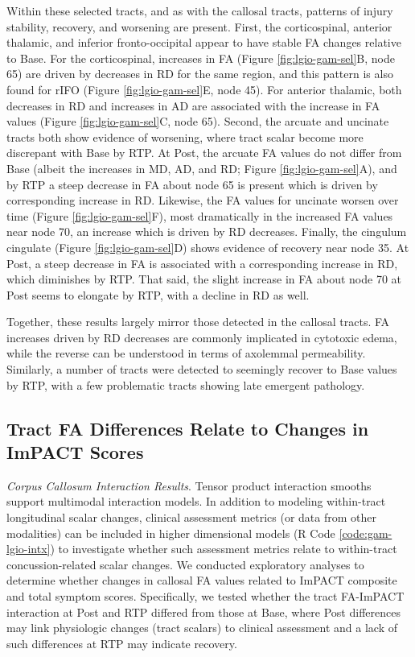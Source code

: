 \documentclass[12pt]{article}
\begin{document}
Within these selected tracts, and as with the callosal tracts, patterns of injury stability, recovery, and worsening are present. First, the corticospinal, anterior thalamic, and inferior fronto-occipital appear to have stable FA changes relative to Base. For the corticospinal, increases in FA (Figure \ref{fig:lgio-gam-sel}B, node 65) are driven by decreases in RD for the same region, and this pattern is also found for rIFO (Figure \ref{fig:lgio-gam-sel}E, node 45). For anterior thalamic, both decreases in RD and increases in AD are associated with the increase in FA values (Figure \ref{fig:lgio-gam-sel}C, node 65). Second, the arcuate and uncinate tracts both show evidence of worsening, where tract scalar become more discrepant with Base by RTP. At Post, the arcuate FA values do not differ from Base (albeit the increases in MD, AD, and RD; Figure \ref{fig:lgio-gam-sel}A), and by RTP a steep decrease in FA about node 65 is present which is driven by corresponding increase in RD. Likewise, the FA values for uncinate worsen over time (Figure \ref{fig:lgio-gam-sel}F), most dramatically in the increased FA values near node 70, an increase which is driven by RD decreases. Finally, the cingulum cingulate (Figure \ref{fig:lgio-gam-sel}D) shows evidence of recovery near node 35. At Post, a steep decrease in FA is associated with a corresponding increase in RD, which diminishes by RTP. That said, the slight increase in FA about node 70 at Post seems to elongate by RTP, with a decline in RD as well.

Together, these results largely mirror those detected in the callosal tracts. FA increases driven by RD decreases are commonly implicated in cytotoxic edema, while the reverse can be understood in terms of axolemmal permeability. Similarly, a number of tracts were detected to seemingly recover to Base values by RTP, with a few problematic tracts showing late emergent pathology.


\subsection{Tract FA Differences Relate to Changes in ImPACT Scores}
\label{ssec:res-dwi-imp}
\textit{Corpus Callosum Interaction Results}. Tensor product interaction smooths support multimodal interaction models. In addition to modeling within-tract longitudinal scalar changes, clinical assessment metrics (or data from other modalities) can be included in higher dimensional models (R Code \ref{code:gam-lgio-intx}) to investigate whether such assessment metrics relate to within-tract concussion-related scalar changes. We conducted exploratory analyses to determine whether changes in callosal FA values related to ImPACT composite and total symptom scores. Specifically, we tested whether the tract FA-ImPACT interaction at Post and RTP differed from those at Base, where Post differences may link physiologic changes (tract scalars) to clinical assessment and a lack of such differences at RTP may indicate recovery.
\end{document}
